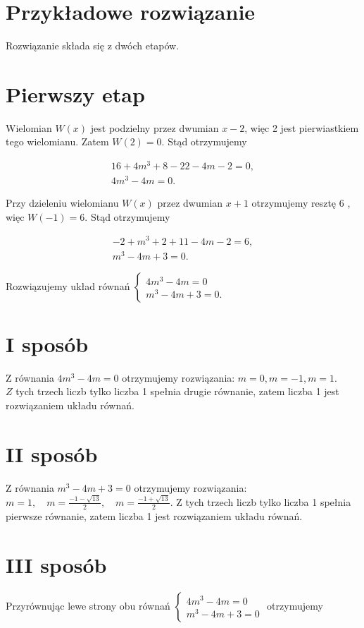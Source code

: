 \documentclass[10pt]{article}
\begin{document}
\section*{Przykładowe rozwiązanie}
Rozwiązanie składa się z dwóch etapów.

\section*{Pierwszy etap}
Wielomian $W(x)$ jest podzielny przez dwumian $x-2$, więc 2 jest pierwiastkiem tego wielomianu. Zatem $W(2)=0$. Stąd otrzymujemy

$$
\begin{gathered}
16+4 m^{3}+8-22-4 m-2=0, \\
4 m^{3}-4 m=0 .
\end{gathered}
$$

Przy dzieleniu wielomianu $W(x)$ przez dwumian $x+1$ otrzymujemy resztę 6 , więc $W(-1)=6$. Stąd otrzymujemy

$$
\begin{gathered}
-2+m^{3}+2+11-4 m-2=6, \\
m^{3}-4 m+3=0 .
\end{gathered}
$$

Rozwiązujemy układ równań $\left\{\begin{array}{l}4 m^{3}-4 m=0 \\ m^{3}-4 m+3=0 .\end{array}\right.$

\section*{I sposób}
Z równania $4 m^{3}-4 m=0$ otrzymujemy rozwiązania: $m=0, m=-1, m=1$.\\
$Z$ tych trzech liczb tylko liczba 1 spełnia drugie równanie, zatem liczba 1 jest rozwiązaniem układu równań.

\section*{II sposób}
Z równania $m^{3}-4 m+3=0$ otrzymujemy rozwiązania: $m=1, \quad m=\frac{-1-\sqrt{13}}{2}, \quad m=\frac{-1+\sqrt{13}}{2}$. Z tych trzech liczb tylko liczba 1 spełnia pierwsze równanie, zatem liczba 1 jest rozwiązaniem układu równań.

\section*{III sposób}
Przyrównując lewe strony obu równań $\left\{\begin{array}{l}4 m^{3}-4 m=0 \\ m^{3}-4 m+3=0\end{array}\right.$ otrzymujemy
\end{document}
